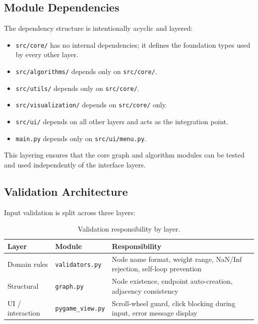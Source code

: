 \documentclass[12pt, a4paper]{article}
\begin{document}
\subsection{Module Dependencies}

The dependency structure is intentionally acyclic and layered:

\begin{itemize}
    \item \texttt{src/core/} has no internal dependencies; it defines the
          foundation types used by every other layer.
    \item \texttt{src/algorithms/} depends only on \texttt{src/core/}.
    \item \texttt{src/utils/} depends only on \texttt{src/core/}.
    \item \texttt{src/visualization/} depends on \texttt{src/core/} only.
    \item \texttt{src/ui/} depends on all other layers and acts as the
          integration point.
    \item \texttt{main.py} depends only on \texttt{src/ui/menu.py}.
\end{itemize}

This layering ensures that the core graph and algorithm modules can be
tested and used independently of the interface layers.

\subsection{Validation Architecture}

Input validation is split across three layers:

\begin{table}[H]
\centering
\caption{Validation responsibility by layer.}
\begin{tabularx}{\linewidth}{@{}L{2.8cm}L{4.2cm}L{6.2cm}@{}}
\toprule
\textbf{Layer} & \textbf{Module} & \textbf{Responsibility} \\
\midrule
Domain rules
  & \texttt{validators.py}
  & Node name format, weight range, NaN/Inf rejection, self-loop prevention \\
Structural
  & \texttt{graph.py}
  & Node existence, endpoint auto-creation, adjacency consistency \\
UI / interaction
  & \texttt{pygame\_view.py}
  & Scroll-wheel guard, click blocking during input, error message display \\
\bottomrule
\end{tabularx}
\end{table}
\end{document}

